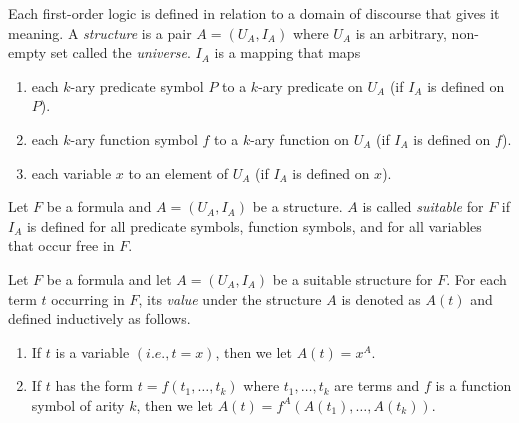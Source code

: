Each first-order logic is defined in relation to a domain of discourse that gives it meaning.
A \textit{structure} is a pair $A = (U_A, I_A)$ where $U_A$ is an arbitrary, non-empty set called the \textit{universe}.
$I_A$ is a mapping that maps

\begin{enumerate}
    \item each $k$-ary predicate symbol $P$ to a $k$-ary predicate on $U_A$ (if $I_A$ is defined on $P$).
    \item each $k$-ary function symbol $f$ to a $k$-ary function on $U_A$ (if $I_A$ is defined on $f$).
    \item each variable $x$ to an element of $U_A$ (if $I_A$ is defined on $x$).
\end{enumerate}

Let $F$ be a formula and $A = (U_A, I_A)$ be a structure.
$A$ is called \textit{suitable} for $F$ if $I_A$ is defined for all predicate symbols, function symbols, and for all variables that occur free in $F$.

Let $F$ be a formula and let $A = (U_A, I_A)$ be a suitable structure for $F$.
For each term $t$ occurring in $F$, its \textit{value} under the structure $A$ is denoted as $A(t)$ and defined inductively as follows.

\begin{enumerate}
    \item If $t$ is a variable $(i.e., t = x)$, then we let $A(t) = x^A$.
    \item If $t$ has the form $t = f(t_1, \ldots, t_k)$ where $t_1, \ldots, t_k$ are terms and $f$ is a function symbol of arity $k$, then we let $A(t) = f^A(A(t_1),\ldots , A(t_k))$.
\end{enumerate}

